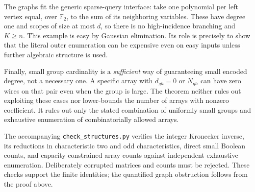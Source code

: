 The graphs fit the generic sparse-query interface: take one polynomial
per left vertex equal, over $\mathbb F_2$, to the sum of its neighboring
variables. These have degree one and scopes of size at most $d$, so there
is no high-incidence branching and $K\ge n$. This example is easy by
Gaussian elimination. Its role is precisely to show that the literal
outer enumeration can be expensive even on easy inputs unless further
algebraic structure is used.

Finally, small group cardinality is a \emph{sufficient} way of guaranteeing
small encoded degree, not a necessary one. A specific array with
$d_{gh}=0$ or $N_{gh}$ can have zero wires on that pair even when the group
is large. The theorem neither rules out exploiting these cases nor
lower-bounds the number of arrays with nonzero coefficient. It rules out
only the stated combination of uniformly small groups and exhaustive
enumeration of combinatorially allowed arrays.

The accompanying \texttt{check\_structures.py} verifies the integer
Kronecker inverse, its reductions in characteristic two and odd
characteristics, direct small Boolean counts, and capacity-constrained
array counts against independent exhaustive enumeration. Deliberately
corrupted matrices and counts must be rejected. These checks support the
finite identities; the quantified graph obstruction follows from the
proof above.

